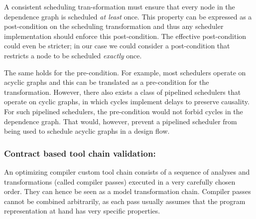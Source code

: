 A consistent scheduling tran-sformation must ensure that every node in the dependence graph is scheduled 
\emph{at least} once. This property can be expressed as a post-condition on the scheduling transformation and thus any scheduler 
implementation should enforce this post-condition. The effective post-condition could even be 
stricter; in our case we could consider a post-condition that restricts a node to be scheduled 
\emph{exactly} once.


The same holds for the pre-condition. For example, most schedulers operate on acyclic graphs and this can 
be translated as a pre-condition for the transformation. However, there also exists a class of 
pipelined schedulers that operate on cyclic graphs, in which cycles implement delays to preserve 
causality. For such pipelined schedulers, the pre-condition would not forbid cycles in the dependence graph.
That would, however, prevent a pipelined scheduler from being used to schedule 
acyclic graphs in a design flow.    

\subsubsection*{Contract based tool chain validation:}

An optimizing compiler custom tool chain consists of a sequence of analyses and transformations (called 
compiler passes) executed in a very carefully chosen order. They can hence be seen as a model 
transformation chain. Compiler passes cannot be combined arbitrarily, as each pass 
usually assumes that the program representation at hand has very specific properties.    


